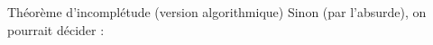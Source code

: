 \begin{frame}{Théorème d'incomplétude (version algorithmique)}
    \pause
    \vspace{3mm}
     Sinon (par l'absurde), on pourrait décider  :
    \begin{algorithm}[H]
    \end{algorithm}
    
\end{frame}

\endgroup
\endinput
